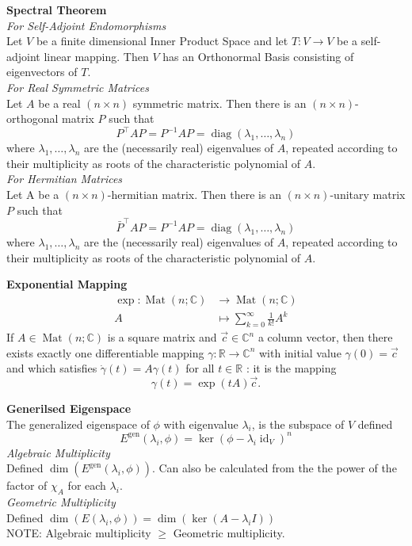 \documentclass[a4paper, 10pt]{article}
\begin{document}
\begin{multicols*}{3}
\textbf{Spectral Theorem}\\
\textit{For Self-Adjoint Endomorphisms}\\
Let $V$ be a finite dimensional Inner Product Space and let $T: V \rightarrow V$ be a self-adjoint linear mapping. 
Then $V$ has an Orthonormal Basis consisting of eigenvectors of $T$.\\
\textit{For Real Symmetric Matrices}\\
Let $A$ be a real $(n \times n)$ symmetric matrix. Then there is an $(n \times n)$-orthogonal matrix $P$ such that
$$
P^{\top} A P=P^{-1} A P=\operatorname{diag}\left(\lambda_1, \ldots, \lambda_n\right)
$$
where $\lambda_1, \ldots, \lambda_n$ are the (necessarily real) eigenvalues of $A$, repeated according to their multiplicity as roots of the characteristic polynomial of $A$.\\
\textit{For Hermitian Matrices}\\
Let A be a $(n \times n)$-hermitian matrix. Then there is an $(n \times n)$-unitary matrix $P$ such that
$$
\bar{P}^{\top} A P=P^{-1} A P=\operatorname{diag}\left(\lambda_1, \ldots, \lambda_n\right)
$$
where $\lambda_1, \ldots, \lambda_n$ are the (necessarily real) eigenvalues of $A$, repeated according to their multiplicity as roots of the characteristic polynomial of $A$.

\textbf{Exponential Mapping}\\
$$
\begin{aligned}
\exp : \operatorname{Mat}(n ; \mathbb{C}) & \rightarrow \operatorname{Mat}(n ; \mathbb{C}) \\
A & \mapsto \sum_{k=0}^{\infty} \frac{1}{k !} A^k
\end{aligned}
$$
If $A \in \operatorname{Mat}(n ; \mathbb{C})$ is a square matrix and $\vec{c} \in \mathbb{C}^n$ a column vector, then there exists exactly one differentiable mapping $\gamma: \mathbb{R} \rightarrow \mathbb{C}^n$ with initial value $\gamma(0)=\vec{c}$ and which satisfies $\dot{\gamma}(t)=A \gamma(t)$ for all $t \in \mathbb{R}$ : it is the mapping
$$
\gamma(t)=\exp (t A) \vec{c} .
$$

\textbf{Generilsed Eigenspace}\\
The generalized eigenspace of $\phi$ with eigenvalue $\lambda_i$, is the subspace of $V$ defined
$$
E^{\text {gen}}\left(\lambda_i, \phi\right)=\ker\left(\phi-\lambda_i \operatorname{id}_V\right)^n
$$
\textit{Algebraic Multiplicity}\\
Defined $\dim (E^{\text {gen}}(\lambda_i, \phi))$. Can also be calculated from the the power of the factor of $\chi_A$ for each $\lambda_i$.\\
\textit{Geometric Multiplicity}\\
Defined $\dim (E\left(\lambda_i, \phi\right))=\dim(\ker(A-\lambda_i I))$\\
NOTE: Algebraic multiplicity $\geq$ Geometric multiplicity.


\end{multicols*}
\end{document}
